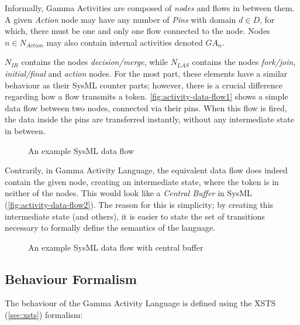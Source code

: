 \begin{definition}
Informally, Gamma Activities are composed of \emph{nodes} and flows in between them. A given  \emph{Action} node may have any number of \emph{Pins} with domain \(d \in D\), for which, there must be one and only one flow connected to the node. Nodes \(n \in N_\mathit{Action}\) may also contain internal activities denoted \(\mathit{GA}_\mathit{n}\).

\(N_\mathit{IR}\) contains the nodes \emph{decision/merge}, while \(N_\mathit{LAS}\) contains the nodes \emph{fork/join}, \emph{initial/final} and \emph{action} nodes. For the most part, these elements have a similar behaviour as their SysML counter parts; however, there is a crucial difference regarding how a flow transmits a token. \autoref{fig:activity-data-flow1} shows a simple data flow between two nodes, connected via their pins. When this flow is fired, the data inside the pins are transferred instantly, without any intermediate state in between. 

\begin{figure}[!ht]
	\centering
	
	\caption{An example SysML data flow}
	\label{fig:activity-data-flow1}
\end{figure}

Contrarily, in Gamma Activity Language, the equivalent data flow does indeed contain the given node, creating an intermediate state, where the token is in neither of the nodes. This would look like a \emph{Central Buffer} in SysML (\autoref{fig:activity-data-flow2}). The reason for this is simplicity; by creating this intermediate state (and others), it is easier to state the set of transitions necessary to formally define the semantics of the language.

\begin{figure}[!ht]
	\centering
	
	\caption{An example SysML data flow with central buffer}
	\label{fig:activity-data-flow2}
\end{figure}
	
\end{definition}\label{def:activity-structure}

\subsection{Behaviour Formalism}

The behaviour of the Gamma Activity Language is defined using the XSTS (\autoref{sec:xsts}) formalism:

